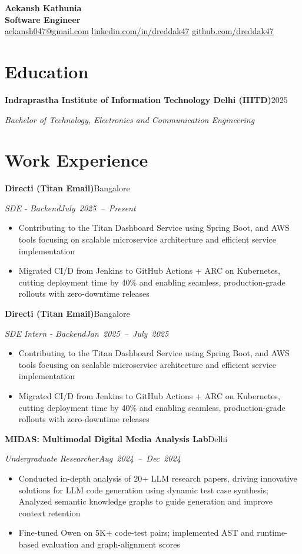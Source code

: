 \documentclass[10pt,letterpaper]{article}
\newcommand{\resumeHeading}[4]{%
  \par\noindent\textbf{#1}\hfill\mbox{#2}\par
  \noindent\textit{#3}\hfill\mbox{\textit{#4}}\par
}
\begin{document}
\begin{center}
  {\LARGE\bfseries Aekansh Kathunia}\\[-1pt]
  \textbf{Software Engineer}\\[1pt]

  \href{mailto:aekansh047@gmail.com}{aekansh047@gmail.com}
  \enspace\textbar\enspace \href{https://www.linkedin.com/in/dreddak47}{linkedin.com/in/dreddak47}
  \enspace\textbar\enspace
  \href{https://github.com/dreddak47}{github.com/dreddak47}
\end{center}
\vspace{-10pt}

\section{Education}
\resumeHeading
  {Indraprastha Institute of Information Technology Delhi (IIITD)}
  {2025}
  {Bachelor of Technology, Electronics and Communication Engineering}
  {}

\section{Work Experience}
\resumeHeading{Directi (Titan Email)}{Bangalore}{SDE - Backend}{July 2025 -- Present}
\begin{itemize}
\item Contributing to the Titan Dashboard Service using Spring Boot, and AWS tools focusing on scalable microservice architecture and efficient service implementation
\item Migrated CI/D from Jenkins to GitHub Actions + ARC on Kubernetes, cutting deployment time by 40\% and enabling seamless, production-grade rollouts with zero-downtime releases
\end{itemize}

\resumeHeading{Directi (Titan Email)}{Bangalore}{SDE Intern - Backend}{Jan 2025 -- July 2025}
\begin{itemize}
\item Contributing to the Titan Dashboard Service using Spring Boot, and AWS tools focusing on scalable microservice architecture and efficient service implementation
\item Migrated CI/D from Jenkins to GitHub Actions + ARC on Kubernetes, cutting deployment time by 40\% and enabling seamless, production-grade rollouts with zero-downtime releases
\end{itemize}

\resumeHeading{MIDAS: Multimodal Digital Media Analysis Lab}{Delhi}{Undergraduate Researcher}{Aug 2024 -- Dec 2024}
\begin{itemize}
\item Conducted in-depth analysis of 20+ LLM research papers, driving innovative solutions for LLM code generation using dynamic test case synthesis; Analyzed semantic knowledge graphs to guide generation and improve context retention
\item Fine-tuned Owen on 5K+ code-test pairs; implemented AST and runtime-based evaluation and graph-alignment scores
\end{itemize}
\end{document}
